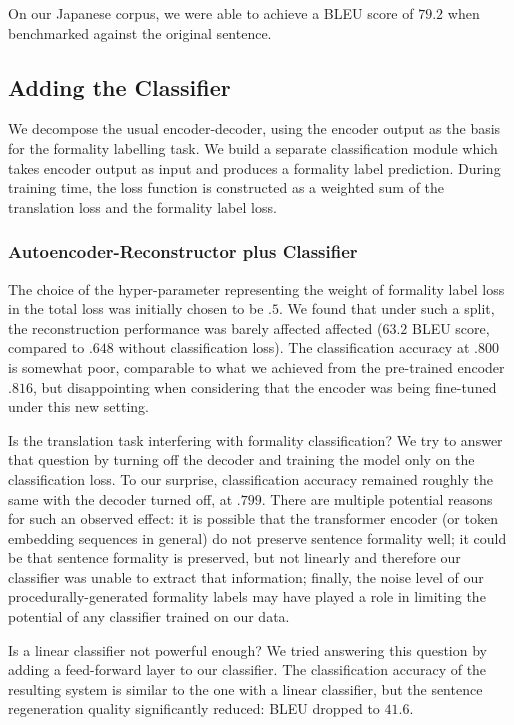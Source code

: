 \documentclass[11pt]{article}
\begin{document}
On our Japanese corpus, we were able to achieve a BLEU score of $79.2$ when benchmarked against the original sentence.

\subsection{Adding the Classifier}

We decompose the usual encoder-decoder, using the encoder output as the basis for the formality labelling task. We build a separate classification module which takes encoder output as input and produces a formality label prediction. During training time, the loss function is constructed as a weighted sum of the translation loss and the formality label loss.

\subsubsection{Autoencoder-Reconstructor plus Classifier}

The choice of the hyper-parameter representing the weight of formality label loss in the total loss was initially chosen to be $.5$. We found that under such a split, the reconstruction performance was barely affected affected ($63.2$ BLEU score, compared to $.648$ without classification loss). The classification accuracy at $.800$ is somewhat poor, comparable to what we achieved from the pre-trained encoder $.816$, but disappointing when considering that the encoder was being fine-tuned under this new setting.

Is the translation task interfering with formality classification? We try to answer that question by turning off the decoder and training the model only on the classification loss. To our surprise, classification accuracy remained roughly the same with the decoder turned off, at $.799$. There are multiple potential reasons for such an observed effect: it is possible that the transformer encoder (or token embedding sequences in general) do not preserve sentence formality well; it could be that sentence formality is preserved, but not linearly and therefore our classifier was unable to extract that information; finally, the noise level of our procedurally-generated formality labels may have played a role in limiting the potential of any classifier trained on our data.

Is a linear classifier not powerful enough? We tried answering this question by adding a feed-forward layer to our classifier. The classification accuracy of the resulting system is similar to the one with a linear classifier, but the sentence regeneration quality significantly reduced: BLEU dropped to $41.6$. 
\end{document}
